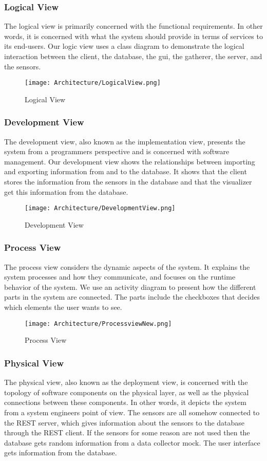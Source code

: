 \documentclass[../document.tex]{subfiles}
\begin{document}
\subsubsection{Logical View}		
The logical view is primarily concerned with the functional requirements. In other words, it is concerned with what the system should provide in terms of services to its end-users. Our logic view uses a class diagram to demonstrate the logical interaction between the client, the database, the gui, the gatherer, the server, and the sensors. 


\begin{figure}[H]
	\centering
	\texttt{[image: Architecture/LogicalView.png]}
	\caption{Logical View}
\end{figure}

\subsubsection{Development View}
The development view, also known as the implementation view,  presents the system from a programmers perspective and is concerned with software management. Our development view shows the relationships between importing and exporting information from and to the database. It shows that the client stores the information from the sensors in the database and that the visualizer get this information from the database.

\begin{figure}[H]
	\centering
	\texttt{[image: Architecture/DevelopmentView.png]}
	\caption{Development View}
\end{figure}

\subsubsection{Process View}
The process view considers the dynamic aspects of the system. It explains the system processes and how they communicate, and focuses on the runtime behavior of the system. We use an activity diagram to present how the different parts in the system are connected. The parts include the checkboxes that decides which elements the user wants to see. 

\begin{figure}[H]
	\centering
	\texttt{[image: Architecture/ProcessviewNew.png]}
	\caption{Process View}
\end{figure}

\subsubsection{Physical View}
The physical view, also known as the deployment view, is concerned with the topology of software components on the physical layer, as well as the physical connections between these components. In other words, it depicts the system from a system engineers point of view. The sensors are all somehow connected to the REST server, which gives information about the sensors to the database through the REST client. If the sensors for some reason are not used then the database gets random information from a data collector mock. The user interface gets information from the database.
\end{document}
